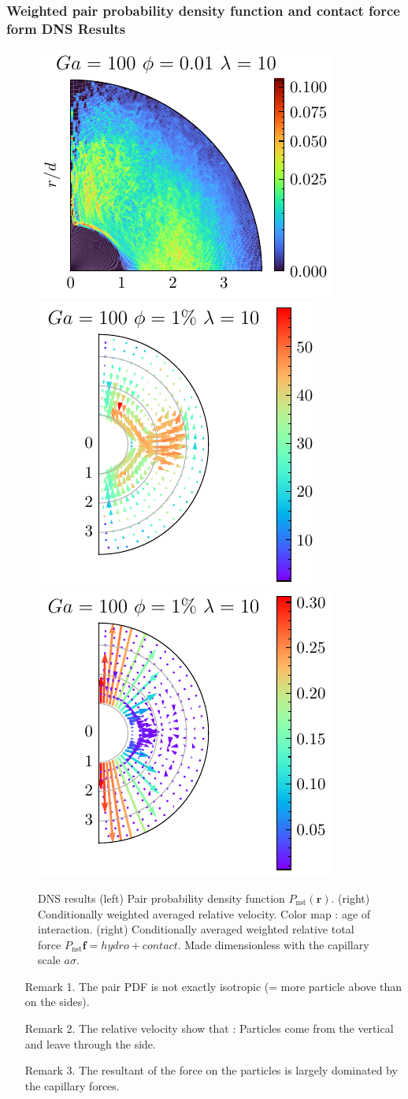 \documentclass{sintefbeamer}
\begin{document}
\begin{frame}
  \frametitle{Weighted pair probability density function and contact force form DNS Results}

\begin{figure}
  \includegraphics[height=0.3\textwidth]{image/HOMOGENEOUS_NEW/Dist/Pnst_l_10_Ga_100_PHI_0_01.pdf}
  \includegraphics[height=0.3\textwidth]{image/HOMOGENEOUS_NEW/Dist/UW_rel_l_10_Ga_100_PHI_1.pdf}
  \includegraphics[height=0.3\textwidth]{image/HOMOGENEOUS_NEW/Dist/FW_rel_l_10_Ga_100_PHI_1.pdf}
  \caption{DNS results (left) Pair probability density function $P_\text{nst}(\textbf{r})$. 
  (right) Conditionally weighted averaged relative velocity. Color map : age of interaction. 
  (right) Conditionally averaged  weighted relative total force $P_\text{nst}\textbf{f} = hydro+contact$. Made dimensionless with the capillary scale $a\sigma$.  
  }
\end{figure}

\begin{enumerate}
  \item[Remark 1.]The pair PDF is not exactly isotropic (= more particle above than on the sides). 
  \item[Remark 2.] The relative velocity show that :
  Particles come from the vertical and leave through the side. 
  \item[Remark 3.] The resultant of the  force  on the particles is largely dominated by the capillary forces.
\end{enumerate}

\end{frame}
\end{document}
